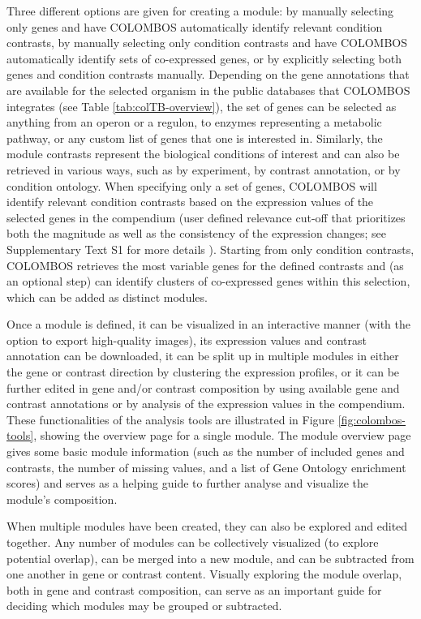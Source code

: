 Three different options are given for creating a module: by manually selecting 
only genes and have COLOMBOS automatically identify relevant condition 
contrasts, by manually selecting only condition contrasts and have COLOMBOS 
automatically identify sets of co-expressed genes, or by explicitly selecting 
both genes and condition contrasts manually. Depending on the gene annotations 
that are available for the selected organism in the public databases that 
COLOMBOS integrates (see Table \ref{tab:colTB-overview}), the set of genes can 
be selected as anything from an operon or a regulon, to enzymes representing a 
metabolic pathway, or any custom list of genes that one is interested in. 
Similarly, the module contrasts represent the biological conditions of interest 
and can also be retrieved in various ways, such as by experiment, by contrast 
annotation, or by condition ontology. When specifying only a set of genes, 
COLOMBOS will identify relevant condition contrasts based on the expression 
values of the selected genes in the compendium (user defined relevance cut-off 
that prioritizes both the magnitude as well as the consistency of the 
expression changes; see Supplementary Text S1 for more details ). Starting from only condition contrasts, COLOMBOS 
retrieves the most variable genes for the defined contrasts and (as an optional 
step) can identify clusters of co-expressed genes within this selection, which 
can be added as distinct modules.

Once a module is defined, it can be visualized in an interactive manner (with 
the option to export high-quality images), its expression values and contrast 
annotation can be downloaded, it can be split up in multiple modules in either 
the gene or contrast direction by clustering the expression profiles, or it can 
be further edited in gene and/or contrast composition by using available gene 
and contrast annotations or by analysis of the expression values in the 
compendium. These functionalities of the analysis tools are illustrated in 
Figure \ref{fig:colombos-tools}, showing the overview page for a single module. 
The module overview page gives some basic module information (such as the 
number of included genes and contrasts, the number of missing values, and a 
list of Gene Ontology enrichment scores) and serves as a helping guide to 
further analyse and visualize the module's composition.

When multiple modules have been created, they can also be explored and edited 
together. Any number of modules can be collectively visualized (to explore 
potential overlap), can be merged into a new module, and can be subtracted from 
one another in gene or contrast content. Visually exploring the module overlap, 
both in gene and contrast composition, can serve as an important guide for 
deciding which modules may be grouped or subtracted.

